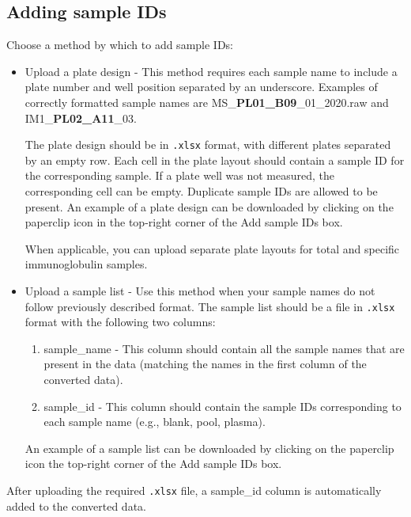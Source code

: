 \subsection{Adding sample IDs}
Choose a method by which to add sample IDs:
\begin{itemize}[topsep=0pt, itemsep=0pt]
	\item 
	\textsf{Upload a plate design}  - This method requires each sample name to include a plate number and well position separated by an underscore. Examples of correctly formatted sample names are \textsf{MS\_\textbf{PL01\_B09}\_01\_2020.raw} and \textsf{IM1\_\textbf{PL02\_A11}\_03}.

	The plate design should be in \texttt{.xlsx} format, with different plates separated by an empty row.
	Each cell in the plate layout should contain a sample ID for the corresponding sample.
	If a plate well was not measured, the corresponding cell can be empty.
	Duplicate sample IDs are allowed to be present.
	An example of a plate design can be downloaded by clicking on the paperclip icon in the top-right corner of the \textsf{Add sample IDs} box.
	
	\begin{optionalbox}
		When applicable, you can upload separate plate layouts for total and specific immunoglobulin samples.
	\end{optionalbox}
	
	
	\item 
	\textsf{Upload a sample list} - Use this method when your sample names do not follow previously described format.
	The sample list should be a file in \texttt{.xlsx} format with the following two columns:
	\begin{enumerate}[topsep=0pt, itemsep=0pt]
		\item 
		\textsf{sample\_name} - This column should contain all the sample names that are present in the data (matching the names in the first column of the converted data).
		\item
		\textsf{sample\_id} - This column should contain the sample IDs corresponding to each sample name (e.g., \textsf{blank}, \textsf{pool}, \textsf{plasma}).
	\end{enumerate}
	An example of a sample list can be downloaded by clicking on the paperclip icon the top-right corner of the \textsf{Add sample IDs} box.
	
\end{itemize}

After uploading the required \texttt{.xlsx} file, a \textsf{sample\_id} column is automatically added to the converted data.


